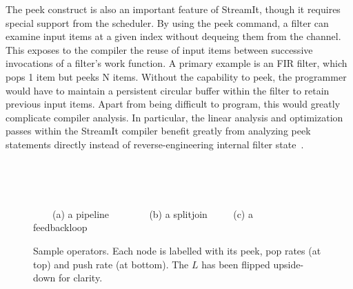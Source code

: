 The peek construct is also an important feature of StreamIt, though it
requires special support from the scheduler.  By using the peek
command, a filter can examine input items at a given index without
dequeing them from the channel.  This exposes to the compiler the
reuse of input items between successive invocations of a filter's work
function.  A primary example is an FIR filter, which pops 1 item but
peeks N items.  Without the capability to peek, the programmer would
have to maintain a persistent circular buffer within the filter to
retain previous input items.  Apart from being difficult to program,
this would greatly complicate compiler analysis.  In particular, the
linear analysis and optimization passes within the StreamIt compiler
benefit greatly from analyzing peek statements directly instead of
reverse-engineering internal filter state~\cite{lamb03}.

\begin{figure}
\begin{center}

\begin{minipage}{0.7in}
\centering {}
\end{minipage}
~~~~~~
\begin{minipage}{0.8in}
\centering {}
\end{minipage}
~~~~~~
\begin{minipage}{0.8in}
\centering {}
\end{minipage}

\vspace{0.1in}

{\small ~~~~(a) a pipeline ~~~~~~~ (b) a splitjoin ~~~~ (c) a feedbackloop~~~~}

\caption{\small Sample {\StreamIt} operators.  Each node is labelled
with its peek, pop rates (at top) and push rate (at bottom).  The $L$
{\filter} has been flipped upside-down for clarity.
\label{fig:steady-state}}
\end{center}
\end{figure}

